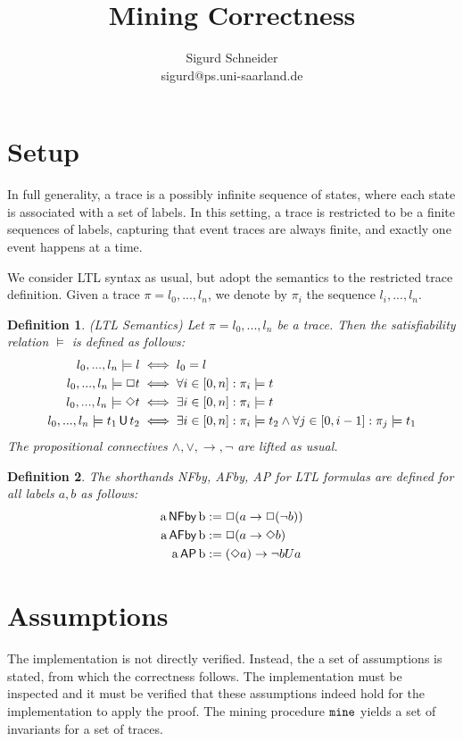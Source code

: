 \documentclass[a4paper,10pt]{scrartcl}
\title{Mining Correctness}
\author{Sigurd Schneider\\sigurd@ps.uni-saarland.de}
\newtheorem{definition}{Definition}
\newcommand{\tr}{\ensuremath{l_0,...,l_n}}
\newcommand{\tri}[1]{\ensuremath{l_{#1},...,l_n}}
\newcommand{\NFBy}[2]{\ensuremath{\textup{{#1}\,\textsf{NFby}\,{#2}}}}
\newcommand{\AFBy}[2]{\ensuremath{\textup{{#1}\,\textsf{AFby}\,{#2}}}}
\newcommand{\AP}[2]{\ensuremath{\textup{{#1}\,\textsf{AP}\,{#2}}}}
\newcommand{\mine}{\ensuremath{\textup{\texttt{mine}}}}
\newcommand{\impl}{\ensuremath{\rightarrow}}
\newcommand{\until}{\ensuremath{\textup{\,\textsf{U}\,}}}
\begin{document}
\maketitle

\section{Setup}
In full generality, a trace is a possibly infinite sequence of states, where each state is associated with a set of labels. In this setting, 
a trace is restricted to be a finite sequences of labels, capturing that event traces are always finite, and exactly one event happens at a time. 

We consider LTL syntax as usual, but adopt the semantics to the restricted trace definition. Given a trace $\pi=\tr$, we denote by $\pi_i$ the 
sequence $\tri{i}$. 



\begin{definition}(LTL Semantics)
Let $\pi=\tr$ be a trace. Then the satisfiability relation $\models$ is defined as follows:
\begin{align*}
 \tr\models{l}&\iff l_0=l\\
 \tr\models{\Box{t}}&\iff\forall{i}\in[0,n]:{}\pi_i\models{t}\\
 \tr\models{\Diamond{t}}&\iff\exists{i}\in[0,n]:{}\pi_i\models{t}\\
 \tr\models{{t_1}\until{t_2}}&\iff\exists{i}\in[0,n]:{}\pi_i\models{t_2}\land\forall{j}\in[0,i-1]:\pi_j\models{}t_1
\end{align*}
\label{sem}
The propositional connectives $\land,\lor,\impl,\neg$ are lifted as usual.
\end{definition}

\begin{definition}
The shorthands \textsf{NFby}, \textsf{AFby}, \textsf{AP} for LTL formulas are defined for all labels $a,b$ as follows:
\begin{align*}
 \NFBy{a}{b}&:= \Box(a\rightarrow\Box(\neg{b}))\\
 \AFBy{a}{b}&:= \Box(a\rightarrow\Diamond{b})\\
 \AP{a}{b}&:= (\Diamond a)\rightarrow{\neg{b}U{a}}
\end{align*}
\label{inv}
\end{definition}
\section{Assumptions}
The implementation is not directly verified. Instead, the a set of assumptions is stated, from which the correctness follows. 
The implementation must be inspected and it must be verified that these assumptions indeed hold for the implementation to apply 
the proof.
The mining procedure $\mine$ yields a set of invariants for a set of traces.
\end{document}
